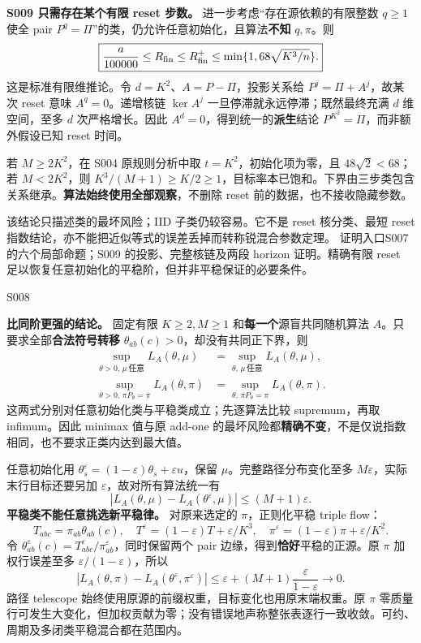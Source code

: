 \documentclass[11pt,a4paper]{article}
\renewcommand{\emph}[1]{\textbf{#1}}
\newcommand{\head}[2]{\begin{center}{\large\sffamily\color{ink}#1}\end{center}\vspace{-4pt}{\LARGE\bfseries #2}\par\vspace{5pt}}
\newcommand{\entry}[1]{\vfill\noindent\small\textcolor{ink}{证明入口}\quad#1\normalsize}
\begin{document}
\textbf{S009 只需存在某个有限 reset 步数。} 进一步考虑“存在源依赖的有限整数 $q\ge1$ 使全 pair $P^q=\Pi$”的类，仍允许任意初始化，且算法\textbf{不知} $q,\pi$。则
\[
 \boxed{\frac a{100000}\le R_{\rm fin}\le R_{\rm fin}^+
 \le\min\{1,68\sqrt{K^3/n}\}.}
\]
这是标准有限维推论。令 $d=K^2$、$A=P-\Pi$，投影关系给 $P^j=\Pi+A^j$，故某次 reset 意味 $A^q=0$。递增核链 $\ker A^j$ 一旦停滞就永远停滞；既然最终充满 $d$ 维空间，至多 $d$ 次严格增长。因此 $A^d=0$，得到统一的\textbf{派生}结论 $P^{K^2}=\Pi$，而非额外假设已知 reset 时间。

若 $M\ge2K^2$，在 S004 原规则分析中取 $t=K^2$，初始化项为零，且 $48\sqrt2<68$；若 $M<2K^2$，则 $K^3/(M+1)\ge K/2\ge1$，目标率本已饱和。下界由三步类包含关系继承。\textbf{算法始终使用全部观察}，不删除 reset 前的数据，也不接收隐藏参数。

该结论只描述类的最坏风险；IID 子类仍较容易。它不是 reset 核分类、最短 reset 指数结论，亦不能把近似等式的误差丢掉而转称锐混合参数定理。
\entry{S007 的六个局部命题；S009 的投影、完整核链及两段 horizon 证明。精确有限 reset 足以恢复任意初始化的平稳阶，但并非平稳保证的必要条件。}

\newpage
\head{S008}{定性正性与遍历性不改善统一最坏风险}
\textbf{比同阶更强的结论。} 固定有限 $K\ge2,M\ge1$ 和\emph{每一个}源盲共同随机算法 $A$。只要求全部\textbf{合法符号转移} $\theta_{ab}(c)>0$，却没有共同正下界，则
\begin{align*}
 \sup_{\theta>0,\,\mu\,\text{任意}}L_A(\theta,\mu)
 &=\sup_{\theta,\,\mu\,\text{任意}}L_A(\theta,\mu),\\
 \sup_{\theta>0,\,\pi P_\theta=\pi}L_A(\theta,\pi)
 &=\sup_{\theta,\,\pi P_\theta=\pi}L_A(\theta,\pi).
\end{align*}
这两式分别对任意初始化类与平稳类成立；先逐算法比较 supremum，再取 infimum。因此 minimax 值与原 add-one 的最坏风险都\textbf{精确不变}，不是仅说指数相同，也不要求正类内达到最大值。

任意初始化用 $\theta_s^\varepsilon=(1-\varepsilon)\theta_s+\varepsilon u$，保留 $\mu$。完整路径分布变化至多 $M\varepsilon$，实际末行目标还要另加 $\varepsilon$，故对所有算法统一有
\[
 |L_A(\theta,\mu)-L_A(\theta^\varepsilon,\mu)|\le(M+1)\varepsilon.
\]
\textbf{平稳类不能任意挑选新平稳律。} 对原来选定的 $\pi$，正则化平稳 triple flow：
\[
 T_{abc}=\pi_{ab}\theta_{ab}(c),\quad
 T^\varepsilon=(1-\varepsilon)T+\varepsilon/K^3,
 \quad\pi^\varepsilon=(1-\varepsilon)\pi+\varepsilon/K^2.
\]
令 $\theta^\varepsilon_{ab}(c)=T^\varepsilon_{abc}/\pi^\varepsilon_{ab}$，同时保留两个 pair 边缘，得到\emph{恰好}平稳的正源。原 $\pi$ 加权行误差至多 $\varepsilon/(1-\varepsilon)$，所以
\[
 |L_A(\theta,\pi)-L_A(\theta^\varepsilon,\pi^\varepsilon)|
 \le\varepsilon+(M+1)\frac\varepsilon{1-\varepsilon}\longrightarrow0.
\]
路径 telescope 始终使用原源的前缀权重，目标变化也用原末端权重。原 $\pi$ 零质量行可发生大变化，但加权贡献为零；没有错误地声称整张表逐行一致收敛。可约、周期及多闭类平稳混合都在范围内。
\end{document}
